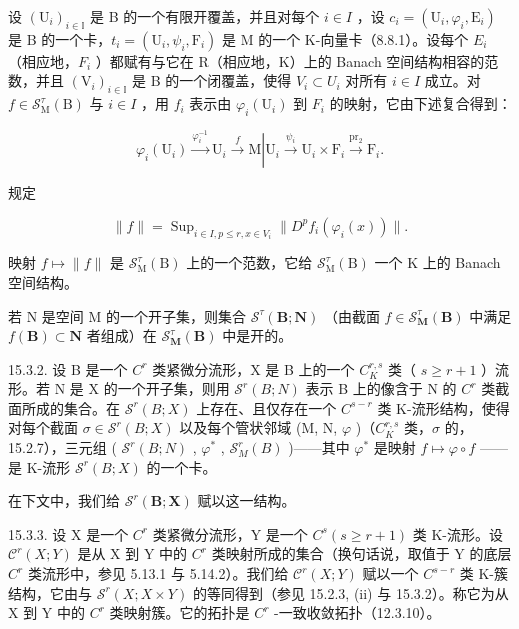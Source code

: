 设 \((\mathrm{U}_{i})_{i\in\mathbb{I}}\) 是 B 的一个有限开覆盖，并且对每个 \(i\in I\) ，设 \(c_{i}=(\mathrm{U}_{i},\varphi_{i},\mathrm{E}_{i})\) 是 B 的一个卡，\(t_{i}=(\mathrm{U}_{i},\psi_{i},\mathrm{F}_{i})\) 是 M 的一个 K-向量卡（8.8.1）。设每个 \(E_{i}\) （相应地，\(F_{i}\) ）都赋有与它在 R（相应地，K）上的 Banach 空间结构相容的范数，并且 \((\mathrm{V}_{i})_{i\in\mathbb{I}}\) 是 B 的一个闭覆盖，使得 \(V_{i}\subset U_{i}\) 对所有 \(i\in I\) 成立。对 \(f\in\mathcal{S}_{\mathrm{M}}^{\tau}(\mathrm{B})\) 与 \(i\in I\) ，用 \(f_{i}\) 表示由 \(\varphi_{i}(\mathrm{U}_{i})\) 到 \(F_{i}\) 的映射，它由下述复合得到：

\[
\varphi_ {i} \left(\mathrm{U} _ {i}\right) \xrightarrow {\varphi_ {i} ^ {- 1}} \mathrm{U} _ {i} \xrightarrow {f} \mathrm{M} \left| \mathrm{U} _ {i} \xrightarrow {\psi_ {i}} \mathrm{U} _ {i} \times \mathrm{F} _ {i} \xrightarrow {\operatorname{pr} _ {2}} \mathrm{F} _ {i}. \right.
\]

规定

\[
\| f \| = \operatorname{Sup} _ {i \in I, p \leqslant r, x \in V _ {i}} \| D ^ {p} f _ {i} (\varphi_ {i} (x)) \|.
\]

映射 \(f\mapsto\|f\|\) 是 \(\mathcal{S}_{\mathrm{M}}^{\tau}(\mathrm{B})\) 上的一个范数，它给 \(\mathcal{S}_{\mathrm{M}}^{\tau}(\mathrm{B})\) 一个 K 上的 Banach 空间结构。

若 N 是空间 M 的一个开子集，则集合 \(\mathcal{S}^{\tau}(\mathbf{B};\mathbf{N})\) （由截面 \(f\in\mathcal{S}_{\mathbf{M}}^{\tau}(\mathbf{B})\) 中满足 \(f(\mathbf{B})\subset\mathbf{N}\) 者组成）在 \(\mathcal{S}_{\mathbf{M}}^{\tau}(\mathbf{B})\) 中是开的。

15.3.2. 设 B 是一个 \(C^{r}\) 类紧微分流形，X 是 B 上的一个 \(C_{K}^{r,s}\) 类（ \(s \geqslant r + 1\) ）流形。若 N 是 X 的一个开子集，则用 \(\mathcal{S}^{r}(B; N)\) 表示 B 上的像含于 N 的 \(C^{r}\) 类截面所成的集合。在 \(\mathcal{S}^{r}(B; X)\) 上存在、且仅存在一个 \(C^{s-r}\) 类 K-流形结构，使得对每个截面 \(\sigma \in \mathcal{S}^{r}(B; X)\) 以及每个管状邻域 (M, N, \(\varphi\) )（\(C_{K}^{r,s}\) 类，\(\sigma\) 的，15.2.7），三元组 ( \(\mathcal{S}^{r}(B; N)\) , \(\varphi^{*}\) , \(\mathcal{S}_{M}^{r}(B)\) )——其中 \(\varphi^{*}\) 是映射 \(f \mapsto \varphi \circ f\) ——是 K-流形 \(\mathcal{S}^{r}(B; X)\) 的一个卡。

在下文中，我们给 \(\mathcal{S}^{r}(\mathbf{B};\mathbf{X})\) 赋以这一结构。

15.3.3. 设 X 是一个 \(C^{r}\) 类紧微分流形，Y 是一个 \(C^{s}(s \geqslant r + 1)\) 类 K-流形。设 \(\mathcal{C}^{r}(X; Y)\) 是从 X 到 Y 中的 \(C^{r}\) 类映射所成的集合（换句话说，取值于 Y 的底层 \(C^{r}\) 类流形中，参见 5.13.1 与 5.14.2）。我们给 \(\mathcal{C}^{r}(X; Y)\) 赋以一个 \(C^{s-r}\) 类 K-簇结构，它由与 \(\mathcal{S}^{r}(X; X \times Y)\) 的等同得到（参见 15.2.3, (ii) 与 15.3.2）。称它为从 X 到 Y 中的 \(C^{r}\) 类映射簇。它的拓扑是 \(C^{r}\) -一致收敛拓扑（12.3.10）。

